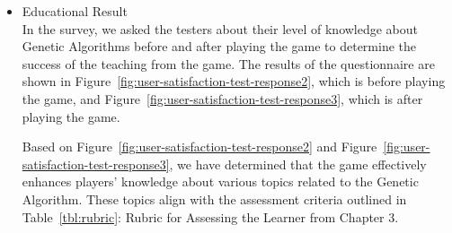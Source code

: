 \documentclass[12pt,oneside,openright,a4paper]{cpe-english-project}
\begin{document}
\begin{itemize}
	\item Educational Result \\
	In the survey, we asked the testers about their level of knowledge about Genetic Algorithms before and after playing the game to determine the success of the teaching from the game. The results of the questionnaire are shown in Figure~\ref{fig:user-satisfaction-test-response2}, which is before playing the game, and Figure~\ref{fig:user-satisfaction-test-response3}, which is after playing the game. \\
\begin{minipage}[c]{\textwidth}\centering
{}
\label{fig:user-satisfaction-test-response2}
\begin{minipage}[c]{\textwidth}\centering
{}
\label{fig:user-satisfaction-test-response3}
\end{minipage}\end{minipage}
	Based on Figure~\ref{fig:user-satisfaction-test-response2} and Figure~\ref{fig:user-satisfaction-test-response3}, we have determined that the game effectively enhances players' knowledge about various topics related to the Genetic Algorithm. These topics align with the assessment criteria outlined in Table~\ref{tbl:rubric}: Rubric for Assessing the Learner from Chapter 3.


\end{itemize}
\end{document}
